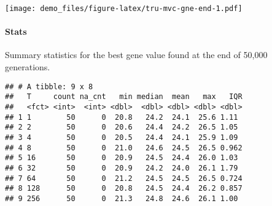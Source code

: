 \documentclass[]{book}
\newenvironment{Shaded}{\begin{snugshade}}{\end{snugshade}}
\newcommand{\DataTypeTok}[1]{\textcolor[rgb]{0.13,0.29,0.53}{#1}}
\newcommand{\DecValTok}[1]{\textcolor[rgb]{0.00,0.00,0.81}{#1}}
\newcommand{\KeywordTok}[1]{\textcolor[rgb]{0.13,0.29,0.53}{\textbf{#1}}}
\newcommand{\NormalTok}[1]{#1}
\newcommand{\OperatorTok}[1]{\textcolor[rgb]{0.81,0.36,0.00}{\textbf{#1}}}
\newcommand{\OtherTok}[1]{\textcolor[rgb]{0.56,0.35,0.01}{#1}}
\newcommand{\StringTok}[1]{\textcolor[rgb]{0.31,0.60,0.02}{#1}}
\let\oldparagraph\paragraph
\renewcommand{\paragraph}[1]{\oldparagraph{#1}\mbox{}}
\begin{document}
\texttt{[image: demo\_files/figure-latex/tru-mvc-gne-end-1.pdf]}

\hypertarget{stats-28}{%
\paragraph{Stats}\label{stats-28}}

Summary statistics for the best gene value found at the end of 50,000 generations.

\begin{Shaded}
\end{Shaded}

\begin{verbatim}
## # A tibble: 9 x 8
##   T     count na_cnt   min median  mean   max   IQR
##   <fct> <int>  <int> <dbl>  <dbl> <dbl> <dbl> <dbl>
## 1 1        50      0  20.8   24.2  24.1  25.6 1.11 
## 2 2        50      0  20.6   24.4  24.2  26.5 1.05 
## 3 4        50      0  20.5   24.4  24.1  25.9 1.09 
## 4 8        50      0  21.0   24.6  24.5  26.5 0.962
## 5 16       50      0  20.9   24.5  24.4  26.0 1.03 
## 6 32       50      0  20.9   24.2  24.0  26.1 1.79 
## 7 64       50      0  21.2   24.5  24.5  26.5 0.724
## 8 128      50      0  20.8   24.5  24.4  26.2 0.857
## 9 256      50      0  21.3   24.8  24.6  26.1 1.00
\end{verbatim}
\end{document}
